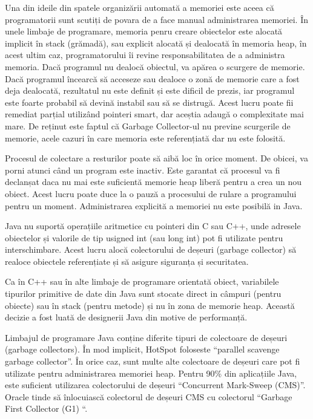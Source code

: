 \documentclass[12pt]{book}
\begin{document}
Una din ideile din spatele organizării automată a memoriei este aceea că programatorii sunt scutiți de povara de a face manual administrarea memoriei. În unele limbaje de programare, memoria penru creare obiectelor este alocată implicit în stack (grămadă), sau explicit alocată și dealocată în memoria heap, în acest ultim caz, programatorului îi revine responsabilitatea de a administra memoria. Dacă programul nu dealocă obiectul, va apărea o scurgere de memorie. Dacă programul încearcă să acceseze sau dealoce o zonă de memorie care a fost deja dealocată, rezultatul nu este definit și este dificil de prezis, iar programul este foarte probabil să devină instabil sau să se distrugă. Acest lucru poate fii remediat parțial utilizând pointeri smart, dar aceștia adaugă o complexitate mai mare. De reținut este faptul că Garbage Collector-ul nu previne scurgerile de memorie, acele cazuri în care memoria este referențiată dar nu este folosită.

Procesul de colectare a resturilor poate să aibă loc în orice moment. De obicei, va porni atunci când un program este inactiv. Este garantat că procesul va fi declanșat daca nu mai este suficientă memorie heap liberă pentru a crea un nou obiect. Acest lucru poate duce la o pauză a procesului de rulare a programului pentru un moment. Administrarea explicită a memoriei nu este posibilă in Java.

Java nu suportă operațiile aritmetice cu pointeri din C sau C++, unde adresele obiectelor și valorile de tip usigned int (sau long int) pot fi utilizate pentru interschimbare. Acest lucru alocă colectorului de deșeuri (garbage collector) să realoce obiectele referențiate și să asigure siguranța și securitatea.

Ca în C++ sau în alte limbaje de programare orientată obiect, variabilele tipurilor primitive de date din Java sunt stocate direct in câmpuri (pentru obiecte) sau în stack (pentru metode) și nu în zona de memorie heap. Această decizie a fost luată de designerii Java din motive de performanță.

Limbajul de programare Java conține diferite tipuri de colectoare de deșeuri (garbage collectors). În mod implicit, HotSpot foloseste “parallel scavenge garbage collector”. În orice caz, sunt multe alte colectoare de deșeuri care pot fi utilizate pentru administrarea memoriei heap. Pentru 90\%  din aplicațiile Java, este suficient utilizarea colectorului de deșeuri “Concurrent Mark-Sweep (CMS)”. Oracle tinde să înlocuiască colectorul de deșeuri CMS cu colectorul “Garbage First Collector (G1) “.
\end{document}
